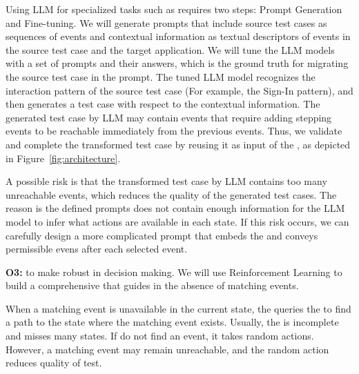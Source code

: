 %


\smallskip
Using LLM for specialized tasks such as \testreuse requires two steps: Prompt Generation and Fine-tuning. 
We will generate prompts that include source test cases as sequences of events and contextual information as textual descriptors of events in the source test case and the target application.
We will tune the LLM models with a set of prompts and their answers, which is the ground truth for migrating the source test case in the prompt.
The tuned LLM model recognizes the interaction pattern of the source test case (For example, the Sign-In pattern), and then generates a test case with respect to the contextual information.
The generated test case by LLM may contain events that require adding stepping events to be reachable immediately from the previous events.
 Thus, we validate and complete the transformed test case by reusing it as input of the \selector, as depicted in Figure~\ref{fig:architecture}. 



\smallskip
A possible risk is that the transformed test case by LLM contains too many unreachable events, which reduces the quality of the generated test cases.
The reason is the defined prompts does not contain enough information  for the LLM model to infer what actions are available in each state.
If this risk occurs, we can carefully design a more complicated prompt that embeds the \tam and conveys permissible evens after each selected event.




\bigskip 
\noindent
\textbf{O3:} to make \testreuse robust in decision making. We will use Reinforcement Learning to build a comprehensive \tam that guides \testreuse in the absence of matching events. 

\smallskip
When a matching event is unavailable in the current state, the \selector queries the \tam to find a path to the state where the matching event exists.
Usually, the \tam is incomplete and misses many states. %
If \selector do not find an event, it takes random actions.  However, a matching event may remain unreachable, and the random action reduces quality of test. 


